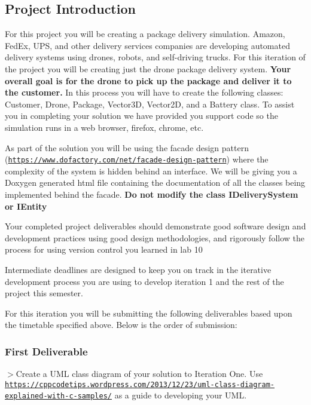 \subsection*{Project Introduction}

For this project you will be creating a package delivery simulation. Amazon, Fed\+Ex, U\+PS, and other delivery services companies are developing automated delivery systems using drones, robots, and self-\/driving trucks. For this iteration of the project you will be creating just the drone package delivery system. {\bfseries Your overall goal is for the drone to pick up the package and deliver it to the customer.} In this process you will have to create the following classes\+: Customer, Drone, Package, Vector3D, Vector2D, and a Battery class. To assist you in completing your solution we have provided you support code so the simulation runs in a web browser, firefox, chrome, etc.

As part of the solution you will be using the facade design pattern (\href{https://www.dofactory.com/net/facade-design-pattern}{\tt https\+://www.\+dofactory.\+com/net/facade-\/design-\/pattern}) where the complexity of the system is hidden behind an interface. We will be giving you a Doxygen generated html file containing the documentation of all the classes being implemented behind the facade. {\bfseries Do not modify the class I\+Delivery\+System or I\+Entity}

Your completed project deliverables should demonstrate good software design and development practices using good design methodologies, and rigorously follow the process for using version control you learned in lab 10

Intermediate deadlines are designed to keep you on track in the iterative development process you are using to develop iteration 1 and the rest of the project this semester.

For this iteration you will be submitting the following deliverables based upon the timetable specified above. Below is the order of submission\+:

\subsubsection*{First Deliverable}

$>$Create a U\+ML class diagram of your solution to Iteration One. Use \href{https://cppcodetips.wordpress.com/2013/12/23/uml-class-diagram-explained-with-c-samples/}{\tt https\+://cppcodetips.\+wordpress.\+com/2013/12/23/uml-\/class-\/diagram-\/explained-\/with-\/c-\/samples/} as a guide to developing your U\+ML.

